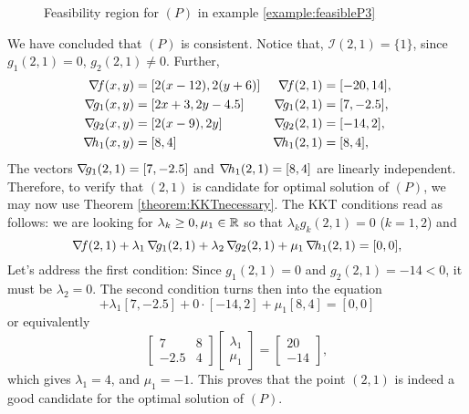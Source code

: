\begin{example}
\begin{figure}[ht!]
\caption{Feasibility region for $(P)$ in example \ref{example:feasibleP3}}
\label{figure:feasibleP3}
\end{figure}
We have concluded that $(P)$ is consistent.  Notice that, $\mathcal{I}(2,1) = \{ 1 \}$, since $g_1(2,1) = 0$, $g_2(2,1) \neq 0$.  Further,
\begin{align*}
\gradient{f}(x,y)   &= [ 2(x-12), 2(y+6) ] &\gradient{f}(2,1)   &= [-20, 14], \\
\gradient{g_1}(x,y) &= [ 2x+3, 2y-4.5 ]    &\gradient{g_1}(2,1) &= [  7, -2.5], \\
\gradient{g_2}(x,y) &= [ 2(x-9), 2y ]      &\gradient{g_2}(2,1) &= [-14, 2], \\
\gradient{h_1}(x,y) &= [ 8, 4]             &\gradient{h_1}(2,1) &= [  8, 4], 
\end{align*}
The vectors $\mathop{\nabla\! {g_1}}(2,1) = [7,-2.5]$ and $\mathop{\nabla\! {h_1}}(2,1)=[8,4]$ are linearly independent.  Therefore, to verify that $(2,1)$ is candidate for optimal solution of $(P)$, we may now use Theorem \ref{theorem:KKTnecessary}.  The KKT conditions read as follows: we are looking for $\lambda_k \geq 0, \mu_1 \in \mathbb{R}$ so that $\lambda_k g_k(2,1)=0$ ($k=1,2$) and
\begin{equation*}
\mathop{\nabla\! {f}}(2,1) + \lambda_1 \mathop{\nabla\! {g_1}}(2,1) + \lambda_2 \mathop{\nabla\! {g_2}}(2,1) + \mu_1 \mathop{\nabla\! {h_1}}(2,1) = [0,0], 
\end{equation*}
Let's address the first condition: Since $g_1(2,1)=0$ and $g_2(2,1)=-14<0$, it must be $\lambda_2=0$.  The second condition turns then into the equation
\begin{equation*}
[-20,14] + \lambda_1 [7,-2.5] + 0 \cdot [-14,2] + \mu_1 [8,4] = [0,0]
\end{equation*}
or equivalently
\begin{equation*}
\begin{bmatrix} 7 & 8 \\ -2.5 & 4 \end{bmatrix} \begin{bmatrix} \lambda_1 \\ \mu_1 \end{bmatrix} = \begin{bmatrix} 20 \\ -14 \end{bmatrix},
\end{equation*}
which gives $\lambda_1=4$, and $\mu_1=-1$.  This proves that the point $(2,1)$ is indeed a good candidate for the optimal solution of $(P)$.
\end{example}


